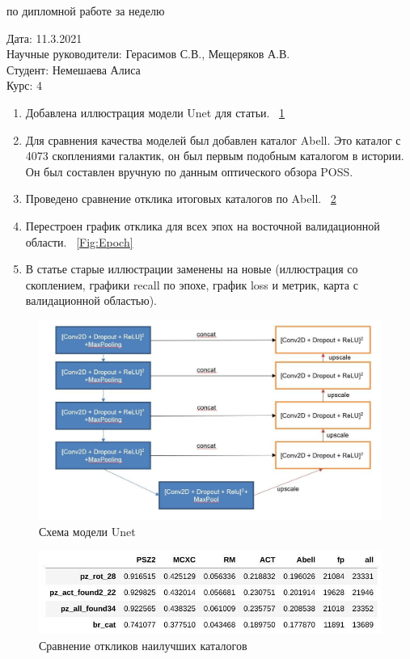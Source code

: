 \documentclass{article}
\begin{document}
\begin{center}{ по дипломной работе за неделю\\}\end{center}
Дата: 11.3.2021\\
Научные руководители: Герасимов С.В., Мещеряков А.В.\\
Студент: Немешаева Алиса\\
Курс: 4\\

\renewcommand{\labelitemi}{$\blacksquare$}
\renewcommand\labelitemii{$\square$}
\begin{enumerate}
    \item Добавлена иллюстрация модели Unet для статьи. 
        ~\ref{Fig:Unet}{}\\
    \item Для сравнения качества моделей был добавлен каталог Abell. Это каталог с 4073 скоплениями 
        галактик, он был первым подобным каталогом в истории. Он был составлен вручную по данным 
        оптического обзора POSS.\\
    \item Проведено сравнение отклика итоговых каталогов по Abell.
        ~\ref{Fig:Recall}{}\\
    \item Перестроен график отклика для всех эпох на восточной валидационной области.
        ~\ref{Fig:Epoch}{}\\
    \item В статье старые иллюстрации заменены на новые (иллюстрация со скоплением, графики recall 
        по эпохе, график loss и метрик, карта с валидационной областью).\\
\end{enumerate}




\begin{figure}[h]
\includegraphics[width=0.8\linewidth]{unet}
\caption{Схема модели Unet}
\label{Fig:Unet}
\end{figure}
\begin{figure}[h]
\includegraphics[width=0.8\linewidth]{recall}
\caption{Сравнение откликов наилучших каталогов}
\label{Fig:Recall}
\end{figure}
\end{document}
